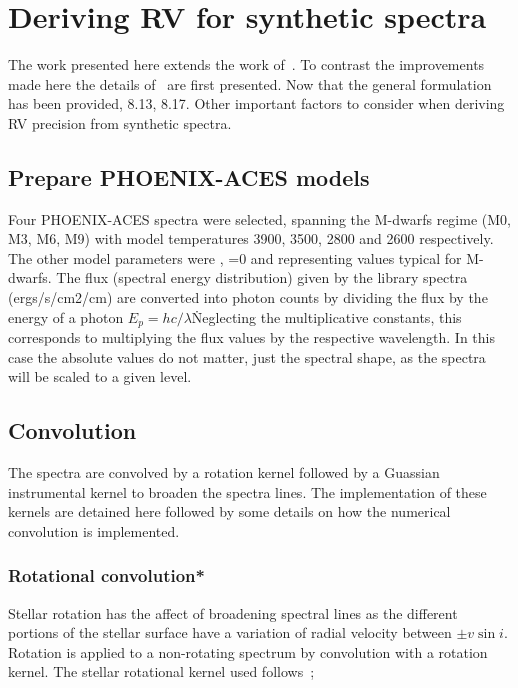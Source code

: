 
\section{Deriving RV for synthetic spectra}
The work presented here extends the work of~\citep{figueira_radial_2016}.
To contrast the improvements made here the details of~\citep{figueira_radial_2016} are first presented.
Now that the general formulation has been provided, 8.13, 8.17.
Other important factors to consider when deriving RV precision from synthetic spectra.

\subsection{Prepare {PHOENIX-ACES} models}
Four {PHOENIX-ACES} spectra were selected, spanning the M-dwarfs regime (M0, M3, M6, M9) with model temperatures 3900, 3500, 2800 and 2600\K{} respectively. The other model parameters were , \feh{}=0 and  representing values typical for M-dwarfs.
The flux (spectral energy distribution) given by the library spectra (ergs/s/cm2/cm) are converted into photon counts by dividing the flux by the energy of a photon \({E}_{p}=hc/\lambda\)\. Neglecting the multiplicative constants, this corresponds to multiplying the flux values by the respective wavelength.
In this case the absolute values do not matter, just the spectral shape, as the spectra will be scaled to a given \snr{} level.

\subsection{Convolution}
The spectra are convolved by a rotation kernel followed by a Guassian instrumental kernel to broaden the spectra lines. 
The implementation of these kernels are detained here followed by some details on how the  numerical convolution is implemented.

\subsubsection{Rotational convolution*}
\label{subsec:rotational_convolution}
Stellar rotation has the affect of broadening spectral lines as the different portions of the stellar surface have a variation of radial velocity between \(\pm v \sin i\).
Rotation is applied to a non-rotating spectrum by convolution with a rotation kernel.
The stellar rotational kernel used follows~\citet{gray_observation_2005};

